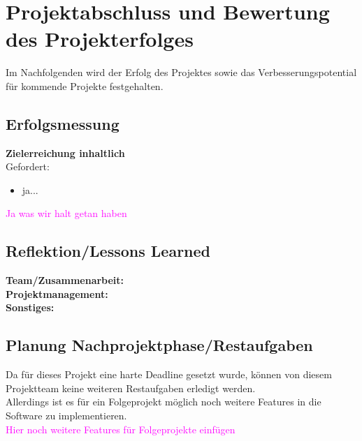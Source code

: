 \chapter{Projektabschluss und Bewertung des Projekterfolges}
\label{sec:Chap7}

Im Nachfolgenden wird der Erfolg des Projektes sowie das Verbesserungspotential für kommende Projekte festgehalten.

\section{Erfolgsmessung}
\textbf{Zielerreichung inhaltlich} \\
Gefordert:
\begin{itemize}
\item ja...
\end{itemize}

\textcolor{magenta}{Ja was wir halt getan haben}

\section{Reflektion/Lessons Learned}
\textbf{Team/Zusammenarbeit:}\\

\textbf{Projektmanagement:}\\

\textbf{Sonstiges:}\\

\section{Planung Nachprojektphase/Restaufgaben}
Da für dieses Projekt eine harte Deadline gesetzt wurde, können von diesem Projektteam keine weiteren Restaufgaben erledigt werden. \\
Allerdings ist es für ein Folgeprojekt möglich noch weitere Features in die Software zu implementieren. \\
\textcolor{magenta}{Hier noch weitere Features für Folgeprojekte einfügen}